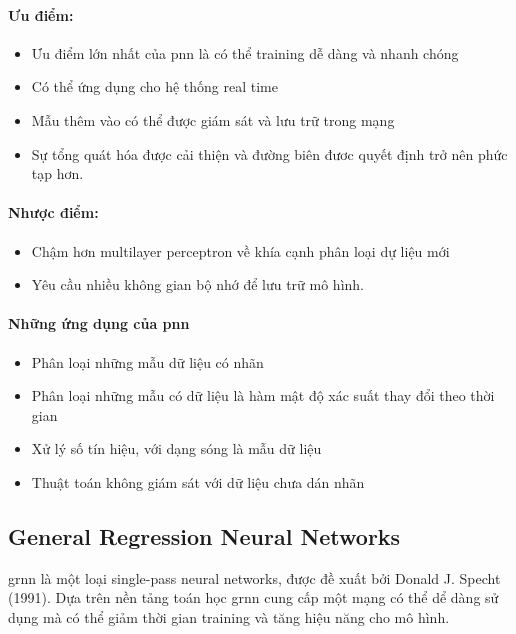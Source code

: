 \paragraph{Ưu điểm:}
\begin{itemize}
	\item Ưu điểm lớn nhất của \ac{pnn} là có thể training dễ dàng và nhanh chóng
	\item Có thể ứng dụng cho hệ thống real time
	\item Mẫu thêm vào có thể được giám sát và lưu trữ trong mạng
	\item Sự tổng quát hóa được cải thiện và đường biên đươc quyết định trở nên phức tạp hơn.
\end{itemize}
\paragraph{Nhược điểm:}
\begin{itemize}
	\item Chậm hơn multilayer perceptron về khía cạnh phân loại dự liệu mới
	\item Yêu cầu nhiều không gian bộ nhớ để lưu trữ mô hình.
\end{itemize}
\paragraph{Những ứng dụng của \ac{pnn}} \cite{PNN_chapter}
\begin{itemize}
	\item Phân loại những mẫu dữ liệu có nhãn 
	\item Phân loại những mẫu có dữ liệu là hàm mật độ xác suất thay đổi theo thời gian
	\item Xử lý số tín hiệu, với dạng sóng là mẫu dữ liệu
	\item Thuật toán không giám sát với dữ liệu chưa dán nhãn
\end{itemize}
\subsection{General Regression Neural Networks}
\ac{grnn} là một loại single-pass neural networks, được đề xuất bởi Donald J. Specht (1991). Dựa trên nền tảng toán học \ac{grnn} cung cấp một mạng có thể dể dàng sử dụng mà có thể giảm thời gian training và tăng hiệu năng cho mô hình.
